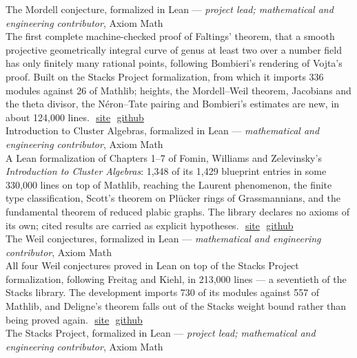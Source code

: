 \documentclass[11pt]{article} %
\begin{document}
 The Mordell conjecture, formalized in Lean --- \emph{project lead; mathematical and engineering contributor}, Axiom Math \\
The first complete machine-checked proof of Faltings' theorem, that a smooth projective geometrically integral curve of genus at least two over a number field has only finitely many rational points, following Bombieri's rendering of Vojta's proof. Built on the Stacks Project formalization, from which it imports 336 modules against 26 of Mathlib; heights, the Mordell--Weil theorem, Jacobians and the theta divisor, the N\'{e}ron--Tate pairing and Bombieri's estimates are new, in about 124,000 lines.\,\, \textcolor[rgb]{0,0,1}{\href{https://axiommath.ai/research/faltings-theorem-formalized/}{site}}\,\, \textcolor[rgb]{0,0,1}{\href{https://github.com/AxiomMath/Mordell}{github}} \\
 Introduction to Cluster Algebras, formalized in Lean --- \emph{mathematical and engineering contributor}, Axiom Math \\
A Lean formalization of Chapters 1--7 of Fomin, Williams and Zelevinsky's \emph{Introduction to Cluster Algebras}: 1,348 of its 1,429 blueprint entries in some 330,000 lines on top of Mathlib, reaching the Laurent phenomenon, the finite type classification, Scott's theorem on Pl\"{u}cker rings of Grassmannians, and the fundamental theorem of reduced plabic graphs. The library declares no axioms of its own; cited results are carried as explicit hypotheses.\,\, \textcolor[rgb]{0,0,1}{\href{https://clusteralgebras.axiommath.ai/}{site}}\,\, \textcolor[rgb]{0,0,1}{\href{https://github.com/AxiomMath/ClusterAlgebras}{github}} \\
 The Weil conjectures, formalized in Lean --- \emph{mathematical and engineering contributor}, Axiom Math \\
All four Weil conjectures proved in Lean on top of the Stacks Project formalization, following Freitag and Kiehl, in 213,000 lines --- a seventieth of the Stacks library. The development imports 730 of its modules against 557 of Mathlib, and Deligne's theorem falls out of the Stacks weight bound rather than being proved again.\,\, \textcolor[rgb]{0,0,1}{\href{https://axiommath.ai/research/the-weil-conjectures-formalized-in-lean/}{site}}\,\, \textcolor[rgb]{0,0,1}{\href{https://github.com/AxiomMath/Weil}{github}} \\
 The Stacks Project, formalized in Lean --- \emph{project lead; mathematical and engineering contributor}, Axiom Math \\
\end{document}
